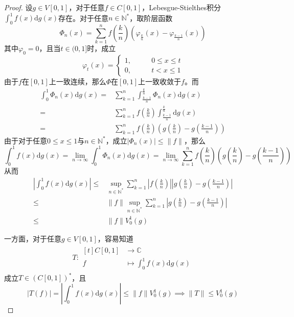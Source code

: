 \documentclass[lang = cn, scheme = chinese, thmcnt = section]{elegantbook}
\newcommand{\N}{\mathbb{N}}            %
\newcommand{\C}{\mathbb{C}}  		   %
\begin{document}
\begin{proof}
	设$g\in V[0,1]$，对于任意$f\in C[0,1]$，Lebesgue-Stielthes积分$\displaystyle \int_0^1 f(x)\mathrm{d}g(x)$存在。对于任意$n\in\N^*$，取阶层函数
	$$
	\Phi_n(x)=\sum_{k=1}^{n}f\left(\frac{k}{n}\right)\left(\varphi_{\frac{k}{n}}(x)-\varphi_{\frac{k-1}{n}}(x)\right)
	$$
	其中$\varphi_0=0$，且当$t\in (0,1]$时，成立
	$$
	\varphi_t(x)=\begin{cases}
		1,\qquad & 0\le x\le t\\
		0,\qquad & t<x\le 1
	\end{cases}
	$$
	由于$f$在$[0,1]$上一致连续，那么$\Phi$在$[0,1]$上一致收敛于$f$。而
	\begin{align*}
		\int_0^1 \Phi_n(x)\mathrm{d}g(x)
		= & \sum_{k=1}^{n}\int_{\frac{k-1}{n}}^{\frac{k}{n}}\Phi_n(x)\mathrm{d}g(x)\\
		= & \sum_{k=1}^{n}f\left(\frac{k}{n}\right)\int_{\frac{k-1}{n}}^{\frac{k}{n}}\mathrm{d}g(x)\\
		= & \sum_{k=1}^{n}f\left(\frac{k}{n}\right)\left(g\left(\frac{k}{n}\right)-g\left(\frac{k-1}{n}\right)\right)
	\end{align*}
	由于对于任意$0\le x\le 1$与$n\in\N^*$，成立$|\Phi_n(x)|\le\|f\|$，那么
	$$
	\int_0^1f(x)\mathrm{d}g(x)
	= \lim_{n\to\infty}\int_0^1\Phi_n(x)\mathrm{d}g(x)
	= \lim_{n\to\infty}\sum_{k=1}^{n}f\left(\frac{k}{n}\right)\left(g\left(\frac{k}{n}\right)-g\left(\frac{k-1}{n}\right)\right)
	$$
	从而
	\begin{align*}
		\left|\int_0^1f(x)\mathrm{d}g(x)\right|
		\le & \sup_{n\in\N^*}\sum_{k=1}^{n}\left|f\left(\frac{k}{n}\right)\right|\left|g\left(\frac{k}{n}\right)-g\left(\frac{k-1}{n}\right)\right|\\
		\le & \|f\|\sup_{n\in\N^*}\sum_{k=1}^{n}\left|g\left(\frac{k}{n}\right)-g\left(\frac{k-1}{n}\right)\right|\\
		\le & \|f\| V_0^1(g)
	\end{align*}

	一方面，对于任意$g\in V[0,1]$，容易知道
	\begin{align*}
		T:\begin{aligned}[t]
			C[0,1]&\longrightarrow \C\\
			f&\longmapsto \int_0^1 f(x)\mathrm{d}g(x)
		\end{aligned}
	\end{align*}
	成立$T\in (C[0,1])^*$，且
	$$
	|T(f)|=\left|\int_0^1f(x)\mathrm{d}g(x)\right|
	\le \|f\| V_0^1(g)\implies
	\|T\|\le V_0^1(g)
	$$
	

\end{proof}
\end{document}
